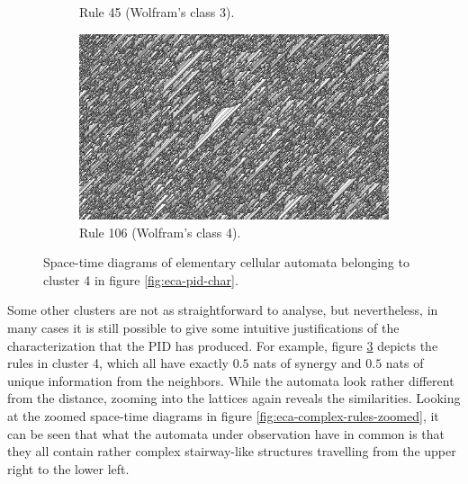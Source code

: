 \documentclass[12pt]{article}
\begin{document}
\begin{figure} [!h]
\begin{subfigure}{.5\textwidth}
  \caption{Rule 45 (Wolfram's class 3).}
  \label{fig:rule45}
\end{subfigure}
\begin{subfigure}{.5\textwidth}
  \centering
  \includegraphics[width=.9\linewidth]{rule106}
  \caption{Rule 106 (Wolfram's class 4).}
  \label{fig:rule106}
\end{subfigure}
\caption{Space-time diagrams of elementary cellular automata belonging to cluster 4 in figure \ref{fig:eca-pid-char}.}
\label{fig:eca-complex-rules}
\end{figure}

Some other clusters are not as straightforward to analyse, but nevertheless, in many cases it is still possible to give some intuitive justifications of the characterization that the PID has produced. For example, figure \ref{fig:eca-complex-rules} depicts the rules in cluster 4, which all have exactly $0.5$ nats of synergy and $0.5$ nats of unique information from the neighbors. While the automata look rather different from the distance, zooming into the lattices again reveals the similarities. Looking at the zoomed space-time diagrams in figure \ref{fig:eca-complex-rules-zoomed}, it can be seen that what the automata under observation have in common is that they all contain rather complex stairway-like structures travelling from the upper right to the lower left.
\end{document}
